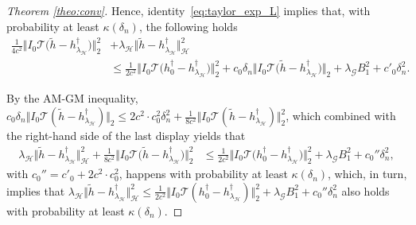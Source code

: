\documentclass[twoside,11pt]{article}
\newcommand{\mc}{\mathcal}
\begin{document}
\begin{proof}[Theorem \ref{theo:conv}]
        Hence, identity~\eqref{eq:taylor_exp_L} implies that, with probability at least $\kappa(\delta_n)$, the following holds
        \begin{align*}
           \frac{1}{4c^2}\big\Vert I_0\mc{T}\big(\tilde h-h_{\lambda_\mc{H}}^\dag\big)\big\Vert_2^2&+\lambda_{\mc{H}}\big\Vert \tilde h- h_{\lambda_\mc{H}}^\dag\big\Vert_{\mc{H}}^2\\
           &\le   \frac{1}{2c^2}\big\Vert  I_0\mc{T}\big(h_0^\dag-h_{\lambda_\mc{H}}^\dag\big)\big\Vert_2^2+c_0\delta_n\big\Vert I_0\mc{T}\big(\tilde h-h_{\lambda_\mc{H}}^\dag\big)\big\Vert_2+\lambda_{\mc{G}}B_1^2+c'_0\delta_n^2.
        \end{align*}

        By the AM-GM inequality, $c_0\delta_n\Vert I_0\mc{T}(\tilde h-h_{\lambda_\mc{H}}^\dag)\Vert_2 \le 2c^2\cdot c_0^2 \delta_n^2 +\frac{1}{8c^2}\Vert I_0\mc{T}(\tilde h-h_{\lambda_\mc{H}}^\dag)\Vert_{2}^2$,
       which combined with the right-hand side of the last display yields that
        \begin{align}
             \lambda_{\mc{H}}\big\Vert \tilde h-h_{\lambda_\mc{H}}^\dag\big\Vert_{\mc{H}}^2+\frac{1}{8c^2}\big\Vert I_0\mc{T}\big(\tilde h-h_{\lambda_\mc{H}}^\dag\big)\big\Vert_2^2&\le  \frac{1}{2c^2}\big\Vert I_0\mc{T}\big(h_0^\dag-h_{\lambda_\mc{H}}^\dag\big)\big\Vert_2^2+\lambda_{\mc{G}}B_1^2+c_0''\delta_n^2,\label{useful_exp}
        \end{align}
        with $c_0''=c'_0+2c^2\cdot c_0^2$, happens with probability at least $\kappa(\delta_n)$, which, in turn, implies that
      $ 
        \lambda_{\mc{H}}\Vert \tilde h-h_{\lambda_\mc{H}}^\dag\Vert_{\mc{H}}^2\le  \frac{1}{2c^2}\Vert I_0\mc{T} (h_0^\dag-h_{\lambda_\mc{H}}^\dag)\Vert_2^2+\lambda_{\mc{G}}B_1^2+c_0''\delta_n^2
       $ also holds with probability at least $\kappa(\delta_n)$.
        

\end{proof}
\end{document}
